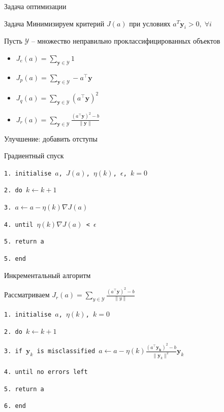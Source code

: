 \documentclass[10pt]{beamer}
\begin{document}
\begin{frame}{Задача оптимизации}

\begin{block}{Задача}
Минимизируем критерий $J(a)$ при условиях $a^T \mathbf{y}_i > 0, \; \forall i$
\end{block}

Пусть $\mathcal{Y}$ -- множество неправильно проклассифицированных объектов
\begin{itemize}
\item $J_e(a) = \sum_{\mathbf{y} \in \mathcal{Y}} 1$ 
\item $J_p(a) = \sum_{\mathbf{y} \in \mathcal{Y}} - a^\top \mathbf{y}$ 
\item $J_q(a) = \sum_{\mathbf{y} \in \mathcal{Y}} (a^\top \mathbf{y})^2$
\item $J_r(a) = \sum_{\mathbf{y} \in \mathcal{Y}} \frac{(a^\top \mathbf{y})^2 - b}{\|\mathbf{y}\|}$
\end{itemize}
Улучшение: добавить отступы

\end{frame}


\begin{frame}{Градиентный спуск}


\texttt{1. initialise $a$, $J(a)$, $\eta(k)$, $\epsilon$, $k=0$}

\texttt{2. \;\; do $k \leftarrow k + 1$}

\texttt{3. \;\;\;\; $a \leftarrow a - \eta(k) \nabla J(a) $}

\texttt{4. \;\; until $\eta(k) \nabla J(a)$ < $\epsilon$}

\texttt{5. return a}

\texttt{5. end}

\vspace{0.5em}

\end{frame}


\begin{frame}{Инкрементальный алгоритм}

Рассматриваем $J_r(a) = \sum_{y \in \mathcal{Y}} \frac{(a^\top \mathbf{y})^2 - b}{\|y\|}$
\vspace{1em}

\texttt{1. initialise $a$, $\eta(k)$, $k=0$}

\texttt{2. \;\; do $k \leftarrow k + 1$}

\texttt{3. \;\;\;\; if $\mathbf{y}_k$ is misclassified $a \leftarrow a - \eta(k)\frac{(a^\top \mathbf{y_k})^2 - b}{\|\mathbf{y}_k\|^2} \mathbf{y}_k $}

\texttt{4. \;\; until no errors left}

\texttt{5. return a}

\texttt{6. end}

\vspace{0.5em}

\end{frame}
\end{document}
